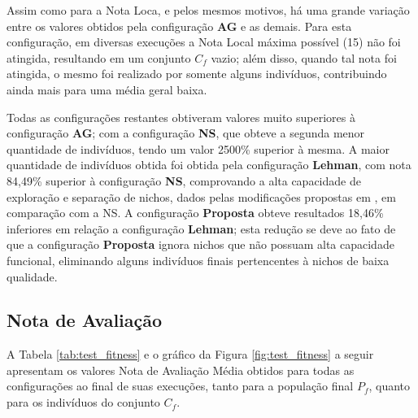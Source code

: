 Assim como para a Nota Loca, e pelos mesmos motivos, há uma grande variação entre os valores obtidos pela configuração \textbf{AG} e as demais. Para esta configuração, em diversas execuções a Nota Local máxima possível (15) não foi atingida, resultando em um conjunto $C_f$ vazio; além disso, quando tal nota foi atingida, o mesmo foi realizado por somente alguns indivíduos, contribuindo ainda mais para uma média geral baixa.

Todas as configurações restantes obtiveram valores muito superiores à configuração \textbf{AG}; com a configuração \textbf{NS}, que obteve a segunda menor quantidade de indivíduos, tendo um valor 2500\% superior à mesma. A maior quantidade de indivíduos obtida foi obtida pela configuração \textbf{Lehman}, com nota 84,49\% superior à configuração \textbf{NS}, comprovando a alta capacidade de exploração e separação de nichos, dados pelas modificações propostas em \cite{lehman2011evolving}, em comparação com a NS. A configuração \textbf{Proposta} obteve resultados 18,46\% inferiores em relação a configuração \textbf{Lehman}; esta redução se deve ao fato de que a configuração \textbf{Proposta} ignora nichos que não possuam alta capacidade funcional, eliminando alguns indivíduos finais pertencentes à nichos de baixa qualidade.

\subsection{Nota de Avaliação}
\label{metrica_nota_avaliacao}

A Tabela \ref{tab:test_fitness} e o gráfico da Figura \ref{fig:test_fitness} a seguir apresentam os valores Nota de Avaliação Média obtidos para todas as configurações ao final de suas execuções, tanto para a população final $P_f$, quanto para os indivíduos do conjunto $C_f$.

\begin{table}[htb]
\centering
\caption{Valores obtidos por cada configuração para Nota de Avaliação Média em $P_f$ e $C_f$.}
\label{tab:test_fitness}
\end{table}

